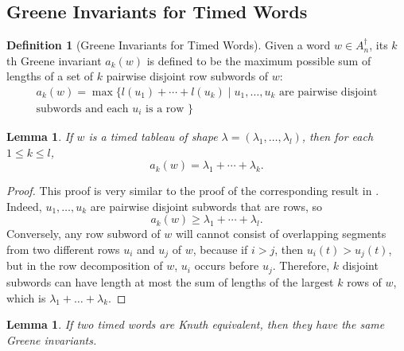 \documentclass[12pt]{amsart}
\newtheorem{lemma}[theorem]{Lemma}
\theoremstyle{definition}
\newtheorem{definition}[theorem]{Definition}
\begin{document}
\subsection{Greene Invariants for Timed Words}
\label{sec:timed-greene-invar}
\begin{definition}[Greene Invariants for Timed Words]
  \label{definition:timed-Greene-invars}
  Given a word $w\in A_n^\dagger$, its $k$th Greene invariant $a_k(w)$ is defined to be the maximum possible sum of lengths of a set of $k$ pairwise disjoint row subwords of $w$:
  \begin{multline*}
    a_k(w) = \max\{l(u_1)+\dotsb+l(u_k)\mid u_1,\dotsc,u_k \text{ are pairwise disjoint}\\ \text{subwords and each $u_i$ is a row }\}
  \end{multline*}
\end{definition}
\begin{lemma}
  \label{lemma:tableau-shape-greene}
  If $w$ is a timed tableau of shape $\lambda=(\lambda_1,\dotsc,\lambda_l)$, then for each $1\leq k\leq l$,
  \begin{displaymath}
    a_k(w) = \lambda_1+\dotsb + \lambda_k.
  \end{displaymath}
\end{lemma}
\begin{proof}
  This proof is very similar to the proof of the corresponding result in \cite{Lascoux}.
  Indeed, $u_1,\dotsc,u_k$ are pairwise disjoint subwords that are rows, so
  \begin{displaymath}
    a_k(w) \geq \lambda_1+\dotsb + \lambda_l.
  \end{displaymath}
  Conversely, any row subword of $w$ will cannot consist of overlapping segments from two different rows $u_i$ and $u_j$ of $w$, because if $i>j$, then $u_i(t)>u_j(t)$, but in the row decomposition of $w$, $u_i$ occurs before $u_j$.
  Therefore, $k$ disjoint subwords can have length at most the sum of lengths of the largest $k$ rows of $w$, which is $\lambda_1+\dotsc+\lambda_k$.
\end{proof}
\begin{lemma}
  \label{lemma:Knuth-Greene}
  If two timed words are Knuth equivalent, then they have the same Greene invariants.
\end{lemma}
\end{document}
